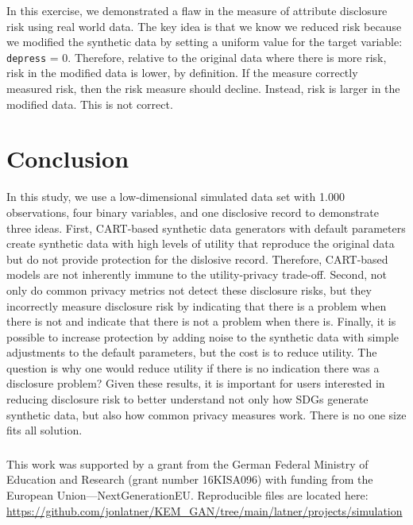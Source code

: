\documentclass[runningheads]{llncs}
\begin{document}
In this exercise, we demonstrated a flaw in the measure of attribute disclosure risk using real world data.  The key idea is that we know we reduced risk because we modified the synthetic data by setting a uniform value for the target variable: \texttt{depress} = 0.  Therefore, relative to the original data where there is more risk, risk in the modified data is lower, by definition.  If the measure correctly measured risk, then the risk measure should decline.  Instead, risk is larger in the modified data.  This is not correct.

\section{Conclusion}

In this study, we use a low-dimensional simulated data set with 1.000 observations, four binary variables, and one disclosive record to demonstrate three ideas.  First, CART-based synthetic data generators with default parameters create synthetic data with high levels of utility that reproduce the original data but do not provide protection for the dislosive record.  Therefore, CART-based models are not inherently immune to the utility-privacy trade-off.  Second, not only do common privacy metrics not detect these disclosure risks, but they incorrectly measure disclosure risk by indicating that there is a problem when there is not and indicate that there is not a problem when there is.  Finally, it is possible to increase protection by adding noise to the synthetic data with simple adjustments to the default parameters, but the cost is to reduce utility.  The question is why one would reduce utility if there is no indication there was a disclosure problem?  Given these results, it is important for users interested in reducing disclosure risk to better understand not only how SDGs generate synthetic data, but also how common privacy measures work.  There is no one size fits all solution. 

\subsubsection{\ackname} This work was supported by a grant from the German Federal Ministry of Education and Research (grant number 16KISA096) with funding from the European Union—NextGenerationEU.  Reproducible files are located here: \url{https://github.com/jonlatner/KEM\_GAN/tree/main/latner/projects/simulation}
\end{document}

